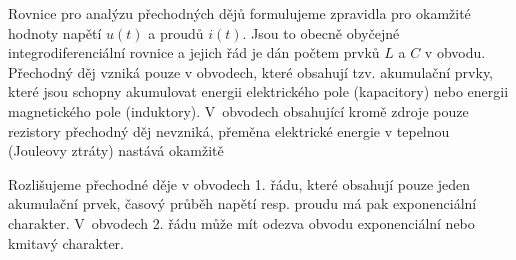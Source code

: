Rovnice pro analýzu přechodných dějů formulujeme zpravidla pro okamžité hodnoty napětí $u(t)$ a proudů $i(t)$. Jsou to obecně obyčejné integrodiferenciální rovnice a jejich řád je dán počtem prvků $L$ a $C$ v obvodu. Přechodný děj vzniká pouze v obvodech, které obsahují tzv. akumulační prvky, které jsou schopny akumulovat energii elektrického pole (kapacitory) nebo energii magnetického pole (induktory). V~obvodech obsahující kromě zdroje pouze rezistory přechodný děj nevzniká, přeměna elektrické energie v tepelnou (Jouleovy ztráty) nastává okamžitě

Rozlišujeme přechodné děje v obvodech 1. řádu, které obsahují pouze jeden akumulační prvek, časový průběh napětí resp. proudu má pak exponenciální charakter. V~obvodech 2. řádu může mít odezva obvodu exponenciální nebo kmitavý charakter.